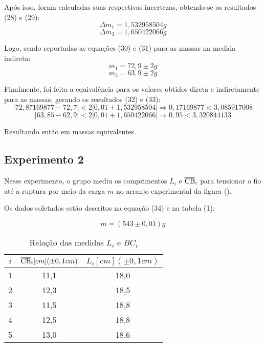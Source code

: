 \documentclass[12pt, letterpaper]{article}
\begin{document}
    Após isso, foram calculadas suas respectivas incertezas, obtendo-se os resultados (28) e (29):
    \begin{equation}
        \Delta m_{1} = 1,532958504 g
    \end{equation}
    \begin{equation}
        \Delta m_{3} = 1,650422066 g
    \end{equation}

    Logo, sendo reportadas as equações (30) e (31) para as massas na medida indireta:
    \begin{equation}
        m_{1} = 72,9 \pm 2 g
    \end{equation}
    \begin{equation}
        m_{3} = 63,9 \pm 2 g
    \end{equation}

    Finalmente, foi feita a equivalência para os valores obtidos direta e indiretamente para as massas, gerando os resultados (32) e (33):
    \begin{equation}
        |72,87169877 - 72,7| < 2|0,01 + 1,532958504| \Rightarrow 0,17169877 < 3,085917008
    \end{equation}
    \begin{equation}
        |63,85 - 62,9| < 2|0,01 + 1,650422066| \Rightarrow 0,95 < 3,320844133
    \end{equation}

    Resultando então em massas equivalentes.
\subsection{Experimento 2}

Nesse experimento, o grupo mediu os comprimentos $L_{i}$ e $\overline{\rm CB}_{i}$ para tensionar o fio até a ruptura por meio da carga $m$ no arranjo experimental da figura ().

Os dados coletados estão descritos na equação (34) e na tabela (1):

\begin{equation}
    m= (543 \pm 0,01)g
\end{equation}

\begin{table}[!h]
 \centering
        \caption{Relação das medidas $L_{i}$ e $BC_{i}$}
         \begin{tabular}{| c | c | c |}
           \hline
             $i$  & $\overline{\rm CB}_{i}[cm](\pm0,1cm)$ & $L_{i}[cm](\pm0,1cm)$  \\
            \hline
               1   & 11,1  &  18,0  \\
           \hline    
            2   &   12,3 &  18,5 \\
           \hline    
            3   &   11,5  &  18,8 \\
           \hline    
               4   & 12,5 &   18,8 \\
           \hline    
               5  &  13,0  & 18,6\\
        
             
             \hline 
        \end{tabular} 
        \label{tab:2}

\end{table}
\end{document}
